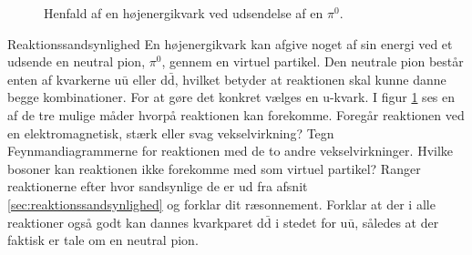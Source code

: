 \begin{figure}[h!]
    \centering
    \caption{Henfald af en højenergikvark ved udsendelse af en $\pi^0$.}
    \label{fig:u-henfald}
\end{figure}
\begin{opgave}{Reaktionssandsynlighed}
    En højenergikvark kan afgive noget af sin energi ved et udsende en neutral pion, $\pi^0$, gennem en virtuel partikel. Den neutrale pion består enten af kvarkerne u$\bar{\mathrm{u}}$ eller d$\bar{\mathrm{d}}$, hvilket betyder at reaktionen skal kunne danne begge kombinationer. For at gøre det konkret vælges en u-kvark.
    \opg I figur \ref{fig:u-henfald} ses en af de tre mulige måder hvorpå reaktionen kan forekomme. Foregår reaktionen ved en elektromagnetisk, stærk eller svag vekselvirkning?
    \opg Tegn Feynmandiagrammerne for reaktionen med de to andre vekselvirkninger.
    \opg Hvilke bosoner kan reaktionen ikke forekomme med som virtuel partikel?
    \opg Ranger reaktionerne efter hvor sandsynlige de er ud fra afsnit \ref{sec:reaktionssandsynlighed} og forklar dit ræsonnement.
    \opg Forklar at der i alle reaktioner også godt kan dannes kvarkparet d$\bar{\mathrm{d}}$ i stedet for u$\bar{\mathrm{u}}$, således at der faktisk er tale om en neutral pion.
\end{opgave}